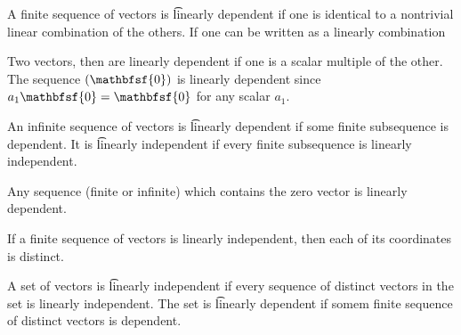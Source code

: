 A finite sequence of vectors is \t{linearly dependent} if one is identical to a nontrivial linear combination of the others.
If one can be written as a linearly combination

Two vectors, then are linearly dependent if one is a scalar multiple of the other.
The sequence $(\mathbfsf{0})$ is linearly dependent since $a_1 \mathbfsf{0} = \mathbfsf{0}$ for any scalar $a_1$.

An infinite sequence of vectors is \t{linearly dependent} if some finite subsequence is dependent.
It is \t{linearly independent} if every finite subsequence is linearly independent.

Any sequence (finite or infinite) which contains the zero vector is linearly dependent.

If a finite sequence of vectors is linearly independent, then each of its coordinates is distinct.

A set of vectors is \t{linearly independent} if every sequence of distinct vectors in the set is linearly independent.
The set is \t{linearly dependent} if somem finite sequence of distinct vectors is dependent.
